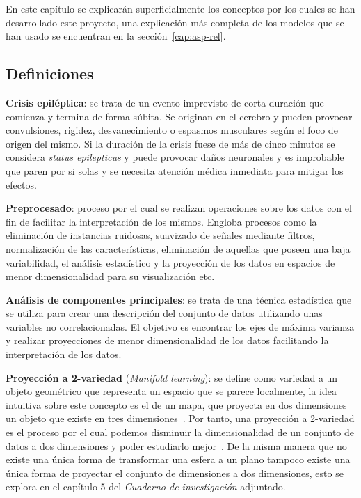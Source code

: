 
En este capítulo se explicarán superficialmente los conceptos por los cuales se han desarrollado este proyecto, una explicación más completa de los modelos que se han usado se encuentran en la sección~\ref{cap:asp-rel}.

\subsection{Definiciones}

\textbf{Crisis epiléptica}: se trata de un evento imprevisto de corta duración que comienza y termina de forma súbita. Se originan en el cerebro y pueden provocar convulsiones, rigidez, desvanecimiento o espasmos musculares según el foco de origen del mismo. Si la duración de la crisis fuese de más de cinco minutos se considera \textit{status epilepticus} y puede provocar daños neuronales y es improbable que paren por si solas y se necesita atención médica inmediata para mitigar los efectos.~\cite{epilepsia}

\textbf{Preprocesado}: proceso por el cual se realizan operaciones sobre los datos con el fin de facilitar la interpretación de los mismos. Engloba procesos como la eliminación de instancias ruidosas, suavizado de señales mediante filtros, normalización de las características, eliminación de aquellas que poseen una baja variabilidad, el análisis estadístico y la proyección de los datos en espacios de menor dimensionalidad para su visualización etc.~\cite{ubu:mineria1}

\textbf{Análisis de componentes principales}: se trata de una técnica estadística que se utiliza para crear una descripción del conjunto de datos utilizando unas variables no correlacionadas. El objetivo es encontrar los ejes de máxima varianza y realizar proyecciones de menor dimensionalidad de los datos facilitando la interpretación de los datos.~\cite{wiki:pca}

\textbf{Proyección a 2-variedad} (\textit{Manifold learning}): se define como variedad a un objeto geométrico que representa un espacio que se parece localmente, la idea intuitiva sobre este concepto es el de un mapa, que proyecta en dos dimensiones un objeto que existe en tres dimensiones~\cite{wiki:manifold}. Por tanto, una proyección a 2-variedad es el proceso por el cual podemos disminuir la dimensionalidad de un conjunto de datos a dos dimensiones y poder estudiarlo mejor~\cite{tool:scikit-learn}. De la misma manera que no existe una única forma de transformar una esfera a un plano tampoco existe una única forma de proyectar el conjunto de dimensiones a dos dimensiones, esto se explora en el capítulo 5 del \textit{Cuaderno de investigación} adjuntado.

